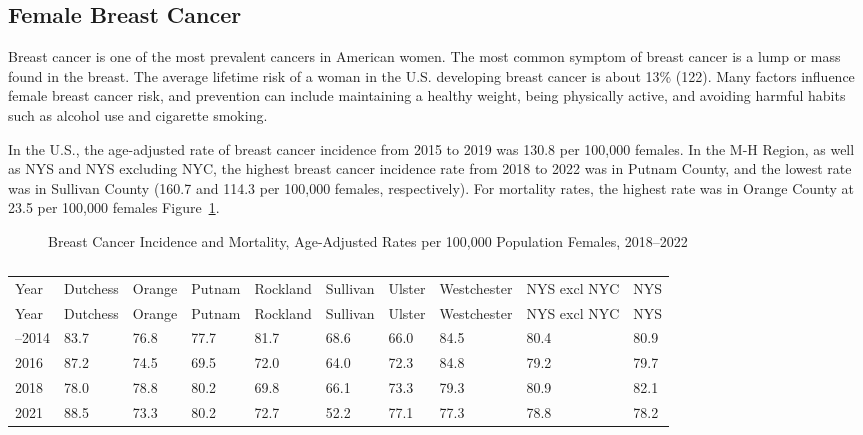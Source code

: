 \documentclass[
  english,
  letterpaper,
]{report}
\begin{document}
\subsection{Female Breast Cancer}\label{female-breast-cancer}

Breast cancer is one of the most prevalent cancers in American women.
The most common symptom of breast cancer is a lump or mass found in the
breast. The average lifetime risk of a woman in the U.S. developing
breast cancer is about 13\% (122). Many factors influence female breast
cancer risk, and prevention can include maintaining a healthy weight,
being physically active, and avoiding harmful habits such as alcohol use
and cigarette smoking.

In the U.S., the age-adjusted rate of breast cancer incidence from 2015
to 2019 was 130.8 per 100,000 females. In the M-H Region, as well as NYS
and NYS excluding NYC, the highest breast cancer incidence rate from
2018 to 2022 was in Putnam County, and the lowest rate was in Sullivan
County (160.7 and 114.3 per 100,000 females, respectively). For
mortality rates, the highest rate was in Orange County at 23.5 per
100,000 females Figure~\ref{fig-female-breastca-incidence-mortal-aar}.

\begin{figure}


\caption{\label{fig-female-breastca-incidence-mortal-aar}Breast Cancer
Incidence and Mortality, Age-Adjusted Rates per 100,000 Population
Females, 2018--2022}

\end{figure}%

\begin{longtable}[]{@{}llllllllll@{}}

\caption{\label{tbl-female-breastca-incidence-mortal-aar}Breast Cancer
Incidence and Mortality, Age-Adjusted Rates per 100,000 Population
Females, 2018--2022}

\tabularnewline

\caption{}\label{T_1a684}\tabularnewline
\toprule\noalign{}
Year & Dutchess & Orange & Putnam & Rockland & Sullivan & Ulster &
Westchester & NYS excl NYC & NYS \\
\midrule\noalign{}
\endfirsthead
\toprule\noalign{}
Year & Dutchess & Orange & Putnam & Rockland & Sullivan & Ulster &
Westchester & NYS excl NYC & NYS \\
\midrule\noalign{}
\endhead
\bottomrule\noalign{}
\endlastfoot
2013--2014 & 83.7 & 76.8 & 77.7 & 81.7 & 68.6 & 66.0 & 84.5 & 80.4 &
80.9 \\
2016 & 87.2 & 74.5 & 69.5 & 72.0 & 64.0 & 72.3 & 84.8 & 79.2 & 79.7 \\
2018 & 78.0 & 78.8 & 80.2 & 69.8 & 66.1 & 73.3 & 79.3 & 80.9 & 82.1 \\
2021 & 88.5 & 73.3 & 80.2 & 72.7 & 52.2 & 77.1 & 77.3 & 78.8 & 78.2 \\

\end{longtable}
\end{document}
